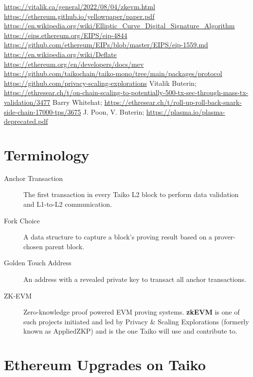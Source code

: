 \documentclass[9pt,oneside]{amsart}
\begin{document}
\begin{thebibliography}{9}
\url{https://vitalik.ca/general/2022/08/04/zkevm.html}
\url{https://ethereum.github.io/yellowpaper/paper.pdf}
\url{https://en.wikipedia.org/wiki/Elliptic_Curve_Digital_Signature_Algorithm}
\url{https://eips.ethereum.org/EIPS/eip-4844}
\url{https://github.com/ethereum/EIPs/blob/master/EIPS/eip-1559.md}
\url{https://en.wikipedia.org/wiki/Deflate}
\url{https://ethereum.org/en/developers/docs/mev}
\url{https://github.com/taikochain/taiko-mono/tree/main/packages/protocol}
\url{https://github.com/privacy-scaling-explorations}
Vitalik Buterin; \url{https://ethresear.ch/t/on-chain-scaling-to-potentially-500-tx-sec-through-mass-tx-validation/3477}
Barry Whitehat; \url{https://ethresear.ch/t/roll-up-roll-back-snark-side-chain-17000-tps/3675}
J. Poon, V. Buterin; \url{https://plasma.io/plasma-deprecated.pdf}
\end{thebibliography}

\appendix

\section{Terminology} \label{ch:Terminology}

\begin{description}
\item[Anchor Transaction] The first transaction in every Taiko L2 block to perform data validation and L1-to-L2 communication.


\item[Fork Choice] A data structure to capture a block's proving result based on a prover-chosen parent block.

\item[Golden Touch Address] An address with a revealed private key to transact all anchor transactions.

\item[ZK-EVM] Zero-knowledge proof powered EVM proving systems. \textbf{zkEVM} is one of such projects initiated and led by 
Privacy \& Scaling Explorations (formerly known as AppliedZKP)\cite{pse} and is the one Taiko will use and contribute to.
\end{description}


\section{Ethereum Upgrades on Taiko}\label{sec:eips}
\end{document}
